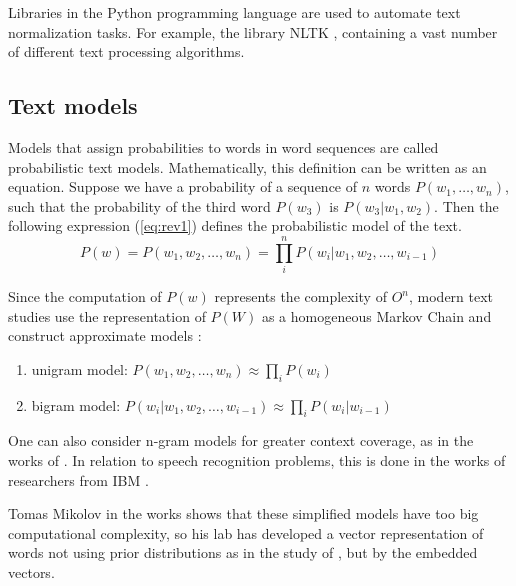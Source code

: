 \documentclass[12pt]{report}
\theoremstyle{definition}
\providecommand{\tightlist}{%
	\setlength{\itemsep}{0pt}\setlength{\parskip}{0pt}}
\begin{document}
Libraries in the Python programming language are used to automate text normalization tasks. 
For example, the library NLTK \cite{bird2009natural}, containing a vast number of different text processing algorithms.

\subsection{Text models}
\label{sec:textmodel}

Models that assign probabilities to words in word sequences are called probabilistic text models. 
Mathematically, this definition can be written as an equation.
Suppose we have a probability of a sequence of $n$ words $ P(w_1, \dots, w_n)$, such that the probability of the third word $P\left( w_3 \right) $ is $P \left(w_3 \vert w_1, w_2 \right)$. 
Then the following expression (\ref{eq:rev1}) defines the probabilistic model of the text.
\begin{equation}
	\label{eq:rev1}
	P \left( w \right)  = P \left( w_1, w_2, \dots , w_n \right) =  \prod_i^n P \left( w_i \vert w_1, w_2, \dots , w_{i-1} \right)
\end{equation}

Since the computation of $P \left( w \right) $ represents the complexity of $O^n$, modern text studies use the representation of $P \left( W \right) $ as a homogeneous Markov Chain and construct approximate models \cite{schwenk2002connectionist}:

\begin{enumerate}
	\tightlist
	\item unigram model: $ P \left(w_1, w_2, \dots , w_n \right)  \approx \prod_i P  \left( w_i \right)$
	\item bigram model: $ P\left( w_i \vert w_1, w_2, \dots , w_{i-1} \right)  \approx  \prod_i P \left( w_i \vert w_{i-1} \right)$
\end{enumerate}

One can also consider n-gram models for greater context coverage, as in the works of \cite{teahan1996entropy, teahan1997models}. 
In relation to speech recognition problems, this is done in the works of researchers from IBM \cite{bahl1983maximum, bahl1986maximum, averbuch1987experiments}.

Tomas Mikolov in the works \cite{mikolov2013efficient, mikolov2013distributed} shows that these simplified models have too big computational complexity, so his lab has developed a vector representation of words not using prior distributions as in the study of \cite{blei2006dynamic}, but by the embedded vectors.
\end{document}
